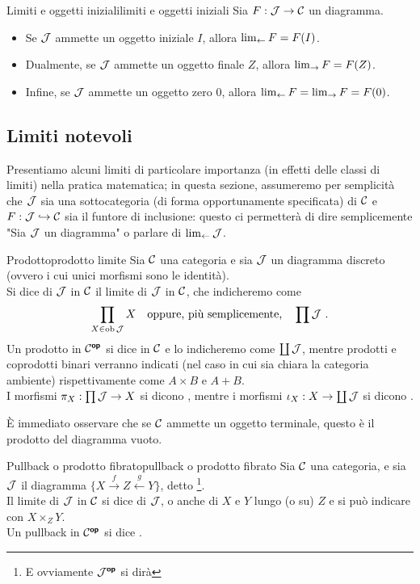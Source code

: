 \documentclass{article}
\renewcommand\C{\mc{C}}
\newcommand\J{\mc{J}}
\begin{document}
\begin{remark}{Limiti e oggetti iniziali}{limiti e oggetti iniziali}
    Sia $F:\J\to\C$ un diagramma.\begin{itemize}
        \item Se $\J$ ammette un oggetto iniziale $I$, allora $\lim_{\leftarrow} F = F(I)$.
        \item Dualmente, se $\J$ ammette un oggetto finale $Z$, allora $\lim_{\rightarrow} F = F(Z)$.
        \item Infine, se $\J$ ammette un oggetto zero $0$, allora $\lim_{\leftarrow} F = \lim_{\rightarrow} F = F(0)$.
    \end{itemize}
\end{remark}

\subsection{Limiti notevoli}

Presentiamo alcuni limiti di particolare importanza (in effetti delle classi di limiti) nella pratica matematica; in questa sezione, assumeremo per semplicità che $\J$ sia una sottocategoria (di forma opportunamente specificata) di $\C$ e $F : \J \inj \C$ sia il funtore di inclusione: questo ci permetterà di dire semplicemente "Sia $\J$ un diagramma" o parlare di $\catlim\J$.

\begin{definition}{Prodotto}{prodotto limite}
    Sia $\C$ una categoria e sia $\J$ un diagramma discreto (ovvero i cui unici morfismi sono le identità).\\
    Si dice  di $\J$ in $\C$ il limite di $\J$ in $\C$, che indicheremo come
    \[ \prod_{X\in\ob\J} X\quad\text{oppure, più semplicemente,}\quad \prod\J\ . \]
    Un prodotto in $\C^\op$ si dice  in $\C$ e lo indicheremo come $\coprod \J$, mentre prodotti e coprodotti binari verranno indicati (nel caso in cui sia chiara la categoria ambiente) rispettivamente come $A\times B$ e $A+B$.\\
    I morfismi $\pi_X : \prod\J\to X$ si dicono , mentre i morfismi $\iota_X: X\to\coprod\J$ si dicono .
\end{definition}

È immediato osservare che se $\C$ ammette un oggetto terminale, questo è il prodotto del diagramma vuoto.

\begin{definition}{Pullback o prodotto fibrato}{pullback o prodotto fibrato}
    Sia $\C$ una categoria, e sia $\J$ il diagramma $\{ X\xrightarrow{f} Z \xleftarrow{g} Y \}$, detto \footnote{E ovviamente $\J^\op$ si dirà }.\\
    Il limite di $\J$ in $\C$ si dice  di $\J$, o anche  di $X$ e $Y$ lungo (o su) $Z$ e si può indicare con $X\times_Z Y$.\\
    Un pullback in $\C^\op$ si dice .
\end{definition}
\end{document}
